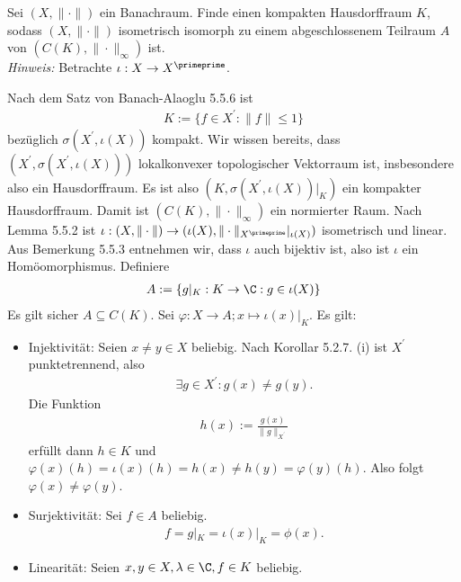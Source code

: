 \begin{exercise}
Sei $(X,\|\cdot\|)$ ein Banachraum. Finde einen kompakten Hausdorffraum $K$, sodass
$(X,\|\cdot\|)$ isometrisch isomorph zu einem abgeschlossenem Teilraum $A$ von
$(C(K),\|\cdot\|_{\infty})$ ist. \\
\textit{Hinweis:} Betrachte $\iota: X \to X^{\primeprime}$.
\end{exercise}
\begin{solution}
Nach dem Satz von Banach-Alaoglu 5.5.6 ist 
\begin{align*}
  K := \{f \in X^{\prime}: \|f\| \leq 1\}
\end{align*}
bezüglich $\sigma(X^{\prime}, \iota(X))$ kompakt.
Wir wissen bereits, dass $(X^{\prime}, \sigma(X^{\prime},\iota(X)))$ lokalkonvexer
topologischer Vektorraum ist, insbesondere also ein Hausdorffraum.
Es ist also $(K, \sigma(X^{\prime},\iota(X))|_K)$ ein kompakter Hausdorffraum.
Damit ist $(C(K), \|\cdot\|_{\infty})$ ein normierter Raum.
Nach Lemma 5.5.2 ist $\iota: (X,\|\cdot\|) \to (\iota(X),\|\cdot\|_{X^{\primeprime}}|_{\iota(X)})$
isometrisch und linear.
Aus Bemerkung 5.5.3 entnehmen wir, dass $\iota$ auch bijektiv ist, also ist $\iota$
ein Homöomorphismus.
Definiere
\begin{align*}
  A := \{g|_K: K \to \C: g \in \iota(X)\}
\end{align*}
Es gilt sicher $A \subseteq C(K)$.
Sei $\varphi: X \to A; x \mapsto \iota(x)|_K$.
Es gilt:
\begin{itemize}
  \item Injektivität: Seien $x \neq y \in X$ beliebig. Nach Korollar 5.2.7. (i)
  ist $X^{\prime}$ punktetrennend, also
  \begin{align*}
    \exists g \in X^{\prime}: g(x) \neq g(y).
  \end{align*}
  Die Funktion
  \begin{align*}
    h(x) := \frac{g(x)}{\|g\|_{X^{\prime}}}
  \end{align*}
  erfüllt dann $h \in K$ und $\varphi(x)(h) = \iota(x)(h) = h(x) \neq h(y) = \varphi(y)(h)$.
  Also folgt $\varphi(x) \neq \varphi(y)$.
  \item Surjektivität: Sei $f \in A$ beliebig. \\
  \begin{align*}
    f = g|_K = \iota(x)|_K = \phi(x).
  \end{align*}
  \item Linearität: Seien $x,y \in X, \lambda \in \C, f \in K$ beliebig.
  \begin{align*}

\end{align*}
\end{itemize}
\end{solution}
